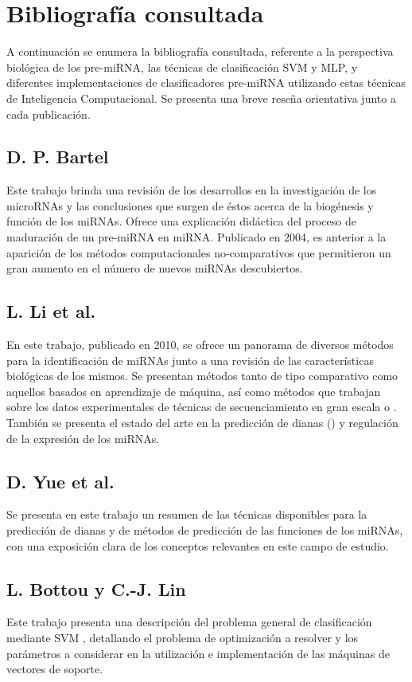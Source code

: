 \documentclass[12pt,bibliography=oldstyle,DIV=12,parskip=half-]{scrreprt}
\begin{document}
\section{Bibliografía consultada}
\label{bibliografia}
%
A continuación se enumera la bibliografía consultada, referente a la
perspectiva biológica de los pre-miRNA, las técnicas de clasificación
SVM y MLP, y diferentes implementaciones de clasificadores pre-miRNA
utilizando estas técnicas de Inteligencia Computacional. Se presenta
una breve reseña orientativa junto a cada publicación.
%
\subsection{D. P. Bartel \cite{bartel116}}
Este trabajo brinda una revisión de los desarrollos en la
investigación de los microRNAs y las conclusiones que surgen de éstos
acerca de la biogénesis y función de los miRNAs.  Ofrece una
explicación didáctica del proceso de maduración de un pre-miRNA en
miRNA.  Publicado en 2004, es anterior a la aparición de los métodos
computacionales no-comparativos que permitieron un gran aumento en el
número de nuevos miRNAs descubiertos.
%
\subsection{L. Li et al. \cite{lili}}
En este trabajo, publicado en 2010, se ofrece un panorama de diversos
métodos para la identificación de miRNAs junto a una revisión de las
características biológicas de los mismos. Se presentan métodos tanto
de tipo comparativo como aquellos basados en aprendizaje de máquina,
así como métodos que trabajan sobre los datos experimentales de
técnicas de secuenciamiento en gran escala o .
También se presenta el estado del arte en la predicción de dianas
() y regulación de la expresión de los miRNAs.
%
\subsection{D. Yue et al. \cite{yue}}
Se presenta en este trabajo un resumen de las técnicas disponibles
para la predicción de dianas y de métodos de predicción de las
funciones de los miRNAs, con una exposición clara de los conceptos
relevantes en este campo de estudio.
%
\subsection{L. Bottou y C.-J. Lin \cite{bottou}}
Este trabajo presenta una descripción del problema general de
clasificación mediante SVM \cite{svm}, detallando el problema de
optimización a resolver y los parámetros a considerar en la
utilización e implementación de las máquinas de vectores de soporte.
%
\end{document}
